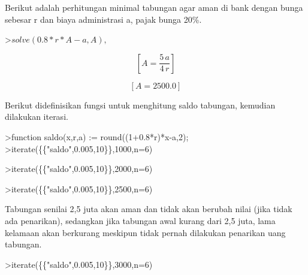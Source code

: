 \documentclass[12pt,arial,letterpaper]{book}
\begin{document}
\begin{eulercomment}
\begin{eulercomment}
\begin{eulercomment}
\begin{eulercomment}
\begin{eulercomment}
\begin{eulercomment}
\begin{eulercomment}
\begin{eulercomment}
\begin{eulercomment}
\begin{eulercomment}
\begin{eulercomment}
\begin{eulercomment}
\begin{eulercomment}
\begin{eulercomment}
\begin{eulercomment}
\begin{eulercomment}
\begin{eulercomment}
\begin{eulercomment}
\begin{eulercomment}
\begin{eulercomment}
\begin{eulercomment}
\begin{eulercomment}
\begin{eulercomment}
Berikut adalah perhitungan minimal tabungan agar aman di bank dengan bunga sebesar r dan
biaya administrasi a, pajak bunga 20\%.
\end{eulercomment}
\begin{eulerprompt}
>$solve(0.8*r*A-a,A), $%
\end{eulerprompt}
\begin{eulerformula}
\[
\left[ A=\frac{5\,a}{4\,r} \right] 
\]
\end{eulerformula}
\begin{eulerformula}
\[
\left[ A=2500.0 \right] 
\]
\end{eulerformula}
\begin{eulercomment}
Berikut didefinisikan fungsi untuk menghitung saldo tabungan, kemudian dilakukan iterasi.
\end{eulercomment}
\begin{eulerprompt}
>function saldo(x,r,a) := round((1+0.8*r)*x-a,2);
>iterate(\{\{"saldo",0.005,10\}\},1000,n=6)
\end{eulerprompt}
\begin{euleroutput}
  [1000,  994,  987.98,  981.93,  975.86,  969.76,  963.64]
\end{euleroutput}
\begin{eulerprompt}
>iterate(\{\{"saldo",0.005,10\}\},2000,n=6)
\end{eulerprompt}
\begin{euleroutput}
  [2000,  1998,  1995.99,  1993.97,  1991.95,  1989.92,  1987.88]
\end{euleroutput}
\begin{eulerprompt}
>iterate(\{\{"saldo",0.005,10\}\},2500,n=6)
\end{eulerprompt}
\begin{euleroutput}
  [2500,  2500,  2500,  2500,  2500,  2500,  2500]
\end{euleroutput}
\begin{eulercomment}
Tabungan senilai 2,5 juta akan aman dan tidak akan berubah nilai (jika tidak ada penarikan),
sedangkan jika tabungan awal kurang dari 2,5 juta, lama kelamaan akan berkurang meskipun
tidak pernah dilakukan penarikan uang tabungan.
\end{eulercomment}
\begin{eulerprompt}
>iterate(\{\{"saldo",0.005,10\}\},3000,n=6)
\end{eulerprompt}

\end{eulercomment}
\end{eulercomment}
\end{eulercomment}
\end{eulercomment}
\end{eulercomment}
\end{eulercomment}
\end{eulercomment}
\end{eulercomment}
\end{eulercomment}
\end{eulercomment}
\end{eulercomment}
\end{eulercomment}
\end{eulercomment}
\end{eulercomment}
\end{eulercomment}
\end{eulercomment}
\end{eulercomment}
\end{eulercomment}
\end{eulercomment}
\end{eulercomment}
\end{eulercomment}
\end{eulercomment}
\end{document}
